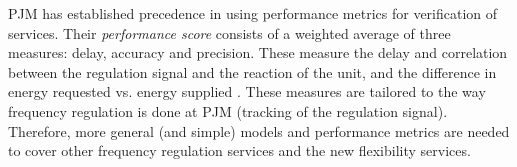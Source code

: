 PJM has established precedence in using performance metrics for verification of services. Their \emph{performance score} consists of a weighted average of three measures: delay, accuracy and precision. These measure the delay and correlation between the regulation signal and the reaction of the unit, and the difference in energy requested vs. energy supplied \cite{pjmperf}. These measures are tailored to the way frequency regulation is done at PJM (tracking of the regulation signal). Therefore, more general (and simple) models and performance metrics are needed to cover other frequency regulation services and the new flexibility services.
